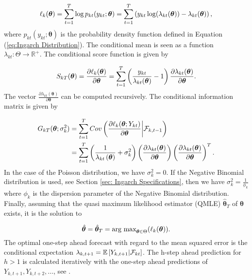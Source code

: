 \begin{equation}
\ell_k(\bm{\theta}) = \sum_{t=1}^T\log p_{kt}(y_{kt};\bm{\theta}) = \sum_{t=1}^T \left(y_{kt}\log(\lambda_{kt}(\bm{\theta})) - \lambda_{kt}(\bm{\theta})\right),
\label{eq: Quasi log likelihood}
\end{equation}
%
where $p_{kt}(y_{kt};\bm{\theta})$ is the probability density function defined in Equation (\ref{eq:Ingarch Distribution}). The conditional mean is seen as a function $\lambda_{kt}: \Theta \rightarrow \mathbb{R}^{+}$. The conditional score function is given by

\begin{equation}
S_{kT}(\bm{\theta}) = \frac{\partial \ell_k(\bm{\theta})}{\partial \bm{\theta}} = \sum_{t=1}^T\left(\frac{y_{kt}}{\lambda_{kt}(\bm{\theta})}-1\right)\frac{\partial\lambda_{kt}(\bm{\theta})}{\partial \bm{\theta}}.
\label{eq:conditional score}
\end{equation}
%
The vector $\frac{\partial\lambda_{kt}(\bm{\theta})}{\partial \bm{\theta}}$ can be computed recursively. 
The conditional information matrix is given by

\begin{equation}
\begin{aligned}
G_{kT}(\bm{\theta};\sigma_k^2) &= \sum_{t=1}^T Cov\left(\frac{\partial \ell_k(\bm{\theta}; Y_{kt})}{\partial \bm{\theta}} \middle| \mathcal{F}_{k,t-1}\right) \\
&=  \sum_{t=1}^T \left(\frac{1}{\lambda_{kt}\left(\bm{\theta}\right)}+\sigma_k^2\right) \left(\frac{\partial \lambda_{kt}(\bm{\theta})}{\partial \bm{\theta}}\right)\left(\frac{\partial \lambda_{kt}(\bm{\theta})}{\partial \bm{\theta}}\right)^T.
\label{eq:conditional information matrix}
\end{aligned}
\end{equation}
%
In the case of the Poisson distribution, we have $\sigma_k^2=0$. If the Negative Binomial distribution is used, see Section \ref{sec: Ingarch Specifications}, then we have $\sigma_k^2=\frac{1}{\phi_k}$ where $\phi_k$ is the dispersion parameter of the Negative Binomial distribution. 
Finally, assuming that the quasi maximum likelihood estimator (QMLE) $\hat{\bm{\theta}}_T$ of $\bm{\theta}$ exists, it is the solution to 

\begin{equation}
\hat{\bm{\theta}}= \hat{\bm{\theta}}_T = \text{arg max}_{\bm{\theta} \in \Theta} (\ell_k(\bm{\theta})). 
\label{eq:ingarch qmle}
\end{equation}
%
The optimal one-step ahead forecast with regard to the mean squared error is the conditional expectation $\lambda_{k,t+1}=\mathbb{E}\left[Y_{k,t+1} | \mathcal{F}_{kt} \right]$. The h-step ahead prediction for $h>1$ is calculated iteratively with the one-step ahead predictions of $Y_{k,t+1},Y_{k,t+2},\ldots$, see \textcite{Liboschik:2016}. 

